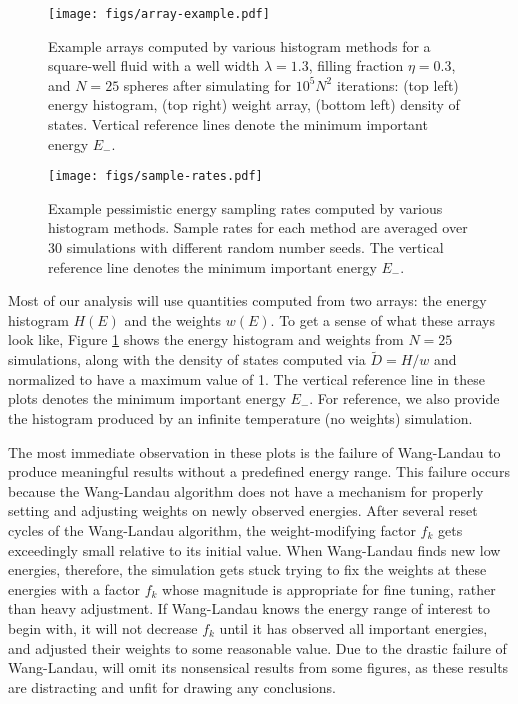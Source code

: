 \documentclass[11pt]{article}
\newcommand{\p}[1]{\left(#1\right)} %
\begin{document}
\begin{figure}
  \centering
  \texttt{[image: figs/array-example.pdf]}
  \caption[Example arrays]
  {Example arrays computed by various histogram methods for a
    square-well fluid with a well width $\lambda=1.3$, filling
    fraction $\eta=0.3$, and $N=25$ spheres after simulating for
    $10^5N^2$ iterations: (top left) energy histogram, (top right)
    weight array, (bottom left) density of states. Vertical reference
    lines denote the minimum important energy $E_-$.}
  \label{fig:arrays}
\end{figure}

\begin{figure}
  \centering
  \texttt{[image: figs/sample-rates.pdf]}
  \caption[Example energy sampling rates]
  {Example pessimistic energy sampling rates computed by various
    histogram methods. Sample rates for each method are averaged over
    30 simulations with different random number seeds. The vertical
    reference line denotes the minimum important energy $E_-$.}
  \label{fig:sample_rates}
\end{figure}

Most of our analysis will use quantities computed from two arrays: the
energy histogram $H\p{E}$ and the weights $w\p{E}$. To get a sense of
what these arrays look like, Figure \ref{fig:arrays} shows the energy
histogram and weights from $N=25$ simulations, along with the density
of states computed via $\tilde D=H/w$ and normalized to have a maximum
value of 1. The vertical reference line in these plots denotes the
minimum important energy $E_-$. For reference, we also provide the
histogram produced by an infinite temperature (no weights) simulation.

The most immediate observation in these plots is the failure of
Wang-Landau to produce meaningful results without a predefined energy
range. This failure occurs because the Wang-Landau algorithm does not
have a mechanism for properly setting and adjusting weights on newly
observed energies. After several reset cycles of the Wang-Landau
algorithm, the weight-modifying factor $f_k$ gets exceedingly small
relative to its initial value. When Wang-Landau finds new low
energies, therefore, the simulation gets stuck trying to fix the
weights at these energies with a factor $f_k$ whose magnitude is
appropriate for fine tuning, rather than heavy adjustment. If
Wang-Landau knows the energy range of interest to begin with, it will
not decrease $f_k$ until it has observed all important energies, and
adjusted their weights to some reasonable value. Due to the drastic
failure of Wang-Landau, will omit its nonsensical results from some
figures, as these results are distracting and unfit for drawing any
conclusions.
\end{document}
